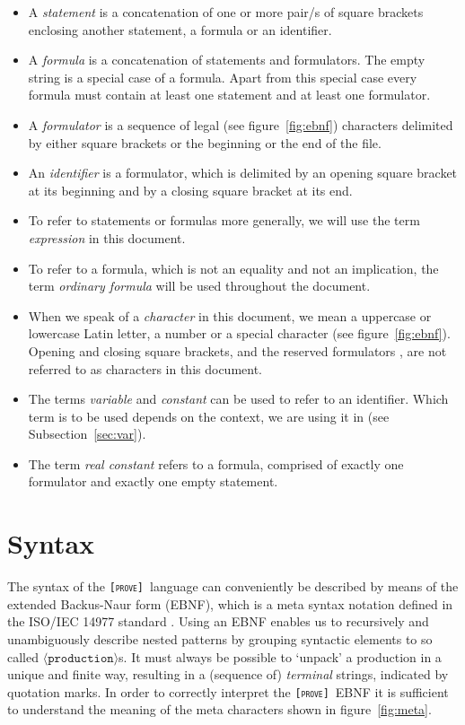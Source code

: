 \documentclass[british]{article}
\newcommand\m[1]{\pcode{\texttt{#1}}}
\newcommand\name{\texttt{\textsc{[prove]}}}
\begin{document}
\begin{itemize}
	\item
		A \emph{statement} is a concatenation of one or more pair/s of square
		brackets enclosing another statement, a formula or an identifier.
	\item
		A \emph{formula} is a concatenation of statements and formulators.
		The empty string is a special case of a formula. Apart from this special
		case every formula must contain at least one statement and at least
		one formulator.
	\item
		A \emph{formulator} is a sequence of legal (see figure~\ref{fig:ebnf})
		characters delimited by either square brackets or the beginning or the
		end of the file.
	\item
		An \emph{identifier} is a formulator, which is delimited by an opening
		square bracket at its beginning and by a closing square bracket at its
		end.
	\item
		To refer to statements or formulas more generally, we will use the
		term \emph{expression }in this document.
	\item
		To refer to a formula, which is not an equality and not an implication,
		the term \emph{ordinary formula} will be used throughout the document.
	\item
		When we speak of a \emph{character} in this document, we mean a
		uppercase or lowercase Latin letter, a number or a special character
		(see figure~\ref{fig:ebnf}). Opening and closing square brackets, and
		the reserved formulators \m{=}, \m{=>} are not referred to as characters
		in this document.
	\item
		The terms \emph{variable} and \emph{constant} can be used to refer
		to an identifier. Which term is to be used depends on the context,
		we are using it in (see Subsection~\ref{sec:var}).
	\item
		The term \emph{real constant} refers to a formula, comprised of exactly
		one formulator and exactly one empty statement.
\end{itemize}

\pagebreak{}

\section{Syntax}

The syntax of the \name\ language can conveniently be described by means of the
extended Backus-Naur form (EBNF), which is a meta syntax notation defined in the
ISO/IEC 14977 standard \parencite{ISO}. Using an EBNF enables us to recursively
and unambiguously describe nested patterns by grouping syntactic elements to so
called $\langle\texttt{production}\rangle$s.  It must always be possible to
`unpack' a production in a unique and finite way, resulting in a (sequence of)
\textit{terminal} strings, indicated by quotation marks. In order to correctly
interpret the \name\ EBNF it is sufficient to understand the meaning of the meta
characters shown in figure~\ref{fig:meta}.
\end{document}
